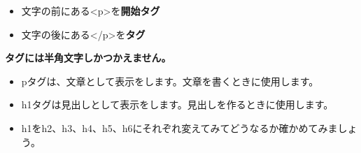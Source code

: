 \documentclass[a4paper,12pt]{jarticle}
\begin{document}
\begin{itemize}
  \item 文字の前にある{\textless}p{\textgreater}を\textbf{開始タグ}
  \item 文字の後にある{\textless}/p{\textgreater}を\textbf{タグ}
\end{itemize}

\textbf{タグには半角文字しかつかえません。}

\begin{itemize}
  \item pタグは、文章として表示をします。文章を書くときに使用します。

  \item h1タグは見出しとして表示をします。見出しを作るときに使用します。
\end{itemize}


\vfill

\theQuestion\label{Q:hasAnswer04-2}

\begin{itemize}
  \item[]
    h1をh2、h3、h4、h5、h6にそれぞれ変えてみてどうなるか確かめてみましょう。
\end{itemize}

\bigskip
\end{document}
